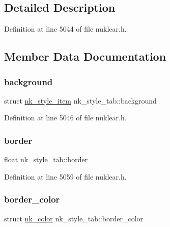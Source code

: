 \subsection{Detailed Description}


Definition at line 5044 of file nuklear.\+h.



\subsection{Member Data Documentation}
\mbox{\label{structnk__style__tab_a9f751874249b6e1a1d35a5e87eb95bda}} 
\subsubsection{\texorpdfstring{background}{background}}
{\footnotesize\ttfamily struct \mbox{\hyperlink{structnk__style__item}{nk\+\_\+style\+\_\+item}} nk\+\_\+style\+\_\+tab\+::background}



Definition at line 5046 of file nuklear.\+h.

\mbox{\label{structnk__style__tab_a5fd25a46147bd54d7700563c2860d1e8}} 
\subsubsection{\texorpdfstring{border}{border}}
{\footnotesize\ttfamily float nk\+\_\+style\+\_\+tab\+::border}



Definition at line 5059 of file nuklear.\+h.

\mbox{\label{structnk__style__tab_ae28051d435a882753fd267fef0637903}} 
\subsubsection{\texorpdfstring{border\+\_\+color}{border\_color}}
{\footnotesize\ttfamily struct \mbox{\hyperlink{structnk__color}{nk\+\_\+color}} nk\+\_\+style\+\_\+tab\+::border\+\_\+color}



